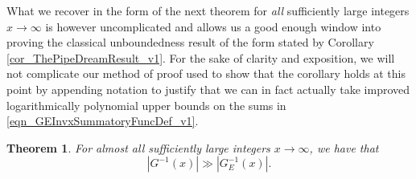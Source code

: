 \documentclass[11pt,reqno,a4letter]{article}
\numberwithin{figure}{section}
\numberwithin{table}{section}
\theoremstyle{plain}
\newtheorem{theorem}{Theorem}
\numberwithin{theorem}{section}
\theoremstyle{definition}
\begin{document}
What we recover in the form of the next theorem for \emph{all} 
sufficiently large integers $x \rightarrow \infty$ 
is however uncomplicated and allows us a good enough window into proving the classical unboundedness 
result of the form stated by Corollary \ref{cor_ThePipeDreamResult_v1}. 
For the sake of clarity and exposition, we will not complicate our method of proof used to show that 
the corollary holds at this point by appending notation to justify that we can 
in fact actually take improved logarithmically polynomial upper bounds on the sums in 
\eqref{eqn_GEInvxSummatoryFuncDef_v1}. 

\begin{theorem} 
\label{theorem_GInvxLowerBoundByGEInvx_v1} 
For almost all sufficiently large integers $x \rightarrow \infty$, we have that 
\[
|G^{-1}(x)| \gg |G_E^{-1}(x)|. 
\]
\end{theorem} 
\end{document}
